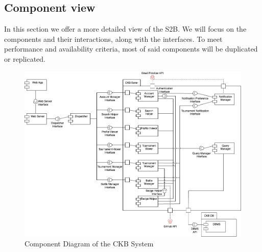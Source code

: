 \subsection{Component view}
In this section we offer a more detailed view of the S2B. We will focus on the components and their interactions, along with the interfaces. To meet performance and availability criteria, most of said components will be duplicated or replicated.
\begin{figure}[h]
    \centering
    \includegraphics[width=1\linewidth]{src/Component Diagram of the CKB System.png}
    \caption{Component Diagram of the CKB System}
    \label{fig:Component Diagram of the CKB System}
\end{figure}
\\
\\
\\
